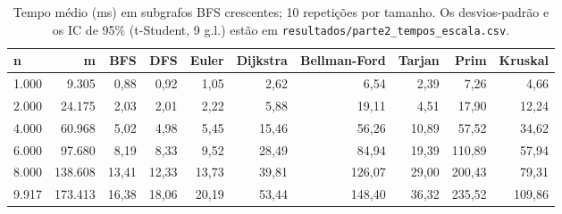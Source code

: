 \begin{table}[!htb]
\centering
\caption{Tempo médio (ms) em subgrafos BFS crescentes; 10 repetições por tamanho. Os desvios-padrão e os IC de 95\% (t-Student, 9 g.l.) estão em \texttt{resultados/parte2\_tempos\_escala.csv}.}
\label{tab:escala}
\begin{adjustbox}{max width=\linewidth}
\begin{tabular}{lrrrrrrrrr}
\toprule
n & m & BFS & DFS & Euler & Dijkstra & Bellman-Ford & Tarjan & Prim & Kruskal \\
\midrule
1.000 & 9.305 & 0,88 & 0,92 & 1,05 & 2,62 & 6,54 & 2,39 & 7,26 & 4,66 \\
2.000 & 24.175 & 2,03 & 2,01 & 2,22 & 5,88 & 19,11 & 4,51 & 17,90 & 12,24 \\
4.000 & 60.968 & 5,02 & 4,98 & 5,45 & 15,46 & 56,26 & 10,89 & 57,52 & 34,62 \\
6.000 & 97.680 & 8,19 & 8,33 & 9,52 & 28,49 & 84,94 & 19,39 & 110,89 & 57,94 \\
8.000 & 138.608 & 13,41 & 12,33 & 13,73 & 39,81 & 126,07 & 29,00 & 200,43 & 79,31 \\
9.917 & 173.413 & 16,38 & 18,06 & 20,19 & 53,44 & 148,40 & 36,32 & 235,52 & 109,86 \\
\bottomrule
\end{tabular}
\end{adjustbox}
\end{table}
